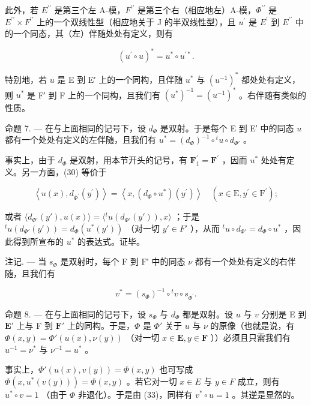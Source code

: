 此外，若 \(E^{\prime\prime}\) 是第三个左 A-模，\(F^{\prime\prime}\) 是第三个右（相应地左）A-模，\(\Phi^{\prime\prime}\) 是 \(E^{\prime\prime} \times F^{\prime\prime}\) 上的一个双线性型（相应地关于 J 的半双线性型），且 \(u^{\prime}\) 是 \(E^{\prime}\) 到 \(E^{\prime\prime}\) 中的一个同态，其（左）伴随处处有定义，则有

\[
(u ^ {\prime} \circ u) ^ {*} = u ^ {*} \circ u ^ {\prime *}.\tag{33}
\]

特别地，若 \(u\) 是 E 到 E′ 上的一个同构，且伴随 \(u^{*}\) 与 \((u^{-1})^{*}\) 都处处有定义，则 \(u^{*}\) 是 F′ 到 F 上的一个同构，且我们有 \((u^{*})^{-1} = (u^{-1})^{*}\) 。右伴随有类似的性质。

命题 7. --- 在与上面相同的记号下，设 \(d_{\Phi}\) 是双射。于是每个 E 到 E′ 中的同态 \(u\) 都有一个处处有定义的左伴随，且我们有 \(u^{*} = (d_{\Phi})^{-1} \circ {}^{t}u \circ d_{\Phi'}\) 。

事实上，由于 \(d_{\Phi}\) 是双射，用本节开头的记号，有 \(\mathbf{F}_{1}^{\prime}=\mathbf{F}^{\prime}\) ，因而 \(u^{*}\) 处处有定义。另一方面，(30) 等价于

\[
\left\langle u (x), d _ {\Phi^ {\prime}} \left(y ^ {\prime}\right) \right\rangle = \left\langle x, \left(d _ {\Phi} \circ u ^ {*}\right) \left(y ^ {\prime}\right) \right\rangle \quad \left(x \in \mathrm{E}, y ^ {\prime} \in \mathrm{F} ^ {\prime}\right);
\]

或者 \(\langle d_{\Phi'}(y'), u(x) \rangle = \langle {}^t u(d_{\Phi'}(y')), x \rangle\) ；于是 \({}^t u(d_{\Phi'}(y')) = d_{\Phi}(u^*(y'))\) （对一切 \(y' \in F'\) ），从而 \({}^t u \circ d_{\Phi'} = d_{\Phi} \circ u^*\) ，因此得到所宣布的 \(u^*\) 的表达式。证毕。

注记. --- 当 \(s_{\Phi}\) 是双射时，每个 F 到 F′ 中的同态 \(\nu\) 都有一个处处有定义的右伴随，且我们有

\[
v ^ {*} = (s _ {\Phi}) ^ {- 1} \circ {} ^ {t} v \circ s _ {\Phi^ {\prime}}.\tag{34}
\]

命题 8. --- 在与上面相同的记号下，设 \(s_{\Phi}\) 与 \(d_{\Phi}\) 都是双射。设 \(u\) 与 \(v\) 分别是 E 到 \(\mathbf{E}'\) 上与 F 到 \(\mathbf{F}'\) 上的同构。于是，\(\Phi\) 是 \(\Phi'\) 关于 \(u\) 与 \(\nu\) 的原像（也就是说，有 \(\Phi(x,y)=\Phi'(u(x),\nu(y))\) （对一切 \(x\in\mathbf{E},y\in\mathbf{F}\) ））必须且只需我们有 \(u^{-1}=\nu^{*}\) 与 \(\nu^{-1}=u^{*}\) 。

事实上，\(\Phi'(u(x), v(y)) = \Phi(x, y)\) 也可写成 \(\Phi(x, u^*(v(y))) = \Phi(x, y)\) 。若它对一切 \(x \in E\) 与 \(y \in F\) 成立，则有 \(u^* \circ v = 1\) （由于 \(\Phi\) 非退化）。于是由 (33)，同样有 \(v^* \circ u = 1\) 。其逆是显然的。

